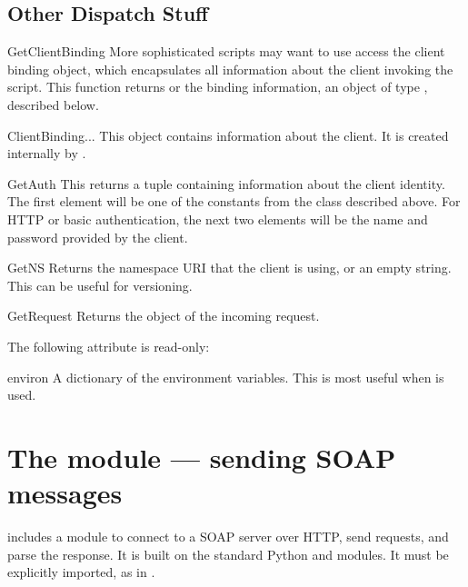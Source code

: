 \subsection{Other Dispatch Stuff}

\begin{methoddesc}{GetClientBinding}{}
More sophisticated scripts may want to use access the client binding object,
which encapsulates all information about the client invoking the script.
This function returns  or the binding information, an
object of type , described below.
\end{methoddesc}

\begin{classdesc}{ClientBinding}{...}
This object contains information about the client.
It is created internally by \ZSI{}.
\end{classdesc}

\begin{methoddesc}{GetAuth}{}
This returns a tuple containing information about the client identity.
The first element will be one of the constants from the  class
described above.
For HTTP or \ZSI{} basic authentication, the next two elements will be
the name and password provided by the client.
\end{methoddesc}

\begin{methoddesc}{GetNS}{}
Returns the namespace URI that the client is using, or an empty string.
This can be useful for versioning.
\end{methoddesc}

\begin{methoddesc}{GetRequest}{}
Returns the  object of the incoming request.
\end{methoddesc}

The following attribute is read-only:

\begin{memberdesc}{environ}
A dictionary of the environment variables.
This is most useful when  is used.
\end{memberdesc}


\section{The  module --- sending SOAP messages}

\ZSI{} includes a module to connect to a SOAP server over HTTP, send requests,
and parse the response.
It is built on the standard Python  and 
modules.
It must be explicitly imported, as in
.

